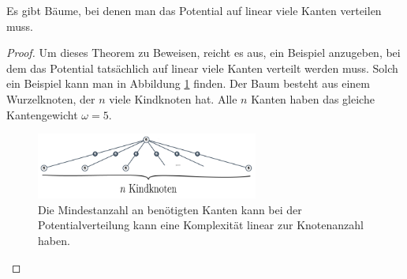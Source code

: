 \begin{theorem}\label{theorem_pot_auf_linear_vielen_kanten}
	Es gibt Bäume, bei denen man das Potential auf linear viele Kanten verteilen muss.
\end{theorem}	
\begin{proof}
	Um dieses Theorem zu Beweisen, reicht es aus, ein Beispiel anzugeben, bei dem das Potential tatsächlich auf linear viele Kanten verteilt werden muss. Solch ein Beispiel kann man in Abbildung \ref{abb_bsp_potverteilen} finden. Der Baum besteht aus einem Wurzelknoten, der $n$ viele Kindknoten hat. Alle $n$ Kanten haben das gleiche Kantengewicht $\omega = 5$.
	
		\begin{figure}[htb]
			\includegraphics[width=0.65\textwidth]{bilder/abb_bsp_potverteilen.png} 
			\captionsetup{width=0.65\textwidth}
			\caption{Die Mindestanzahl an benötigten Kanten kann bei der Potentialverteilung kann eine Komplexität linear zur Knotenanzahl haben.}
			\label{abb_bsp_potverteilen}
		\end{figure}
		

\end{proof}
